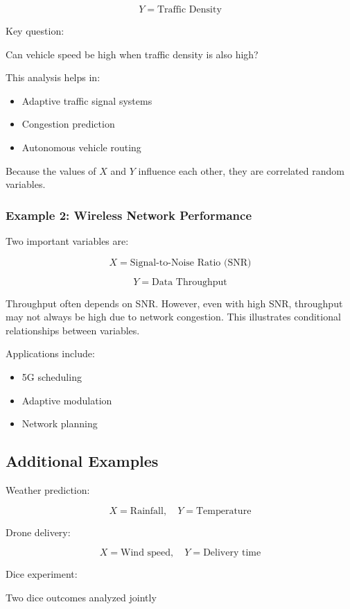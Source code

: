 \documentclass[12pt]{article}
\begin{document}
\[
Y = \text{Traffic Density}
\]

Key question:

Can vehicle speed be high when traffic density is also high?

This analysis helps in:

\begin{itemize}
\item Adaptive traffic signal systems
\item Congestion prediction
\item Autonomous vehicle routing
\end{itemize}

Because the values of $X$ and $Y$ influence each other, they are correlated random variables.

\subsubsection*{Example 2: Wireless Network Performance}

Two important variables are:

\[
X = \text{Signal-to-Noise Ratio (SNR)}
\]

\[
Y = \text{Data Throughput}
\]

Throughput often depends on SNR. However, even with high SNR, throughput may not always be high due to network congestion. This illustrates conditional relationships between variables.

Applications include:

\begin{itemize}
\item 5G scheduling
\item Adaptive modulation
\item Network planning
\end{itemize}

\subsection*{Additional Examples}

Weather prediction:

\[
X = \text{Rainfall}, \quad Y = \text{Temperature}
\]

Drone delivery:

\[
X = \text{Wind speed}, \quad Y = \text{Delivery time}
\]

Dice experiment:

Two dice outcomes analyzed jointly
\end{document}

